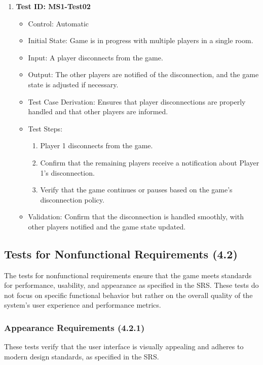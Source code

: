 \documentclass[12pt, titlepage]{article}
\begin{document}
\begin{enumerate}
    \item \textbf{Test ID: MS1-Test02}
        \begin{itemize}
            \item Control: Automatic
            \item Initial State: Game is in progress with multiple players in a single room.
            \item Input: A player disconnects from the game.
            \item Output: The other players are notified of the disconnection, and the game state is adjusted if necessary.
            \item Test Case Derivation: Ensures that player disconnections are properly handled and that other players are informed.
            \item Test Steps:
                \begin{enumerate}
                    \item Player 1 disconnects from the game.
                    \item Confirm that the remaining players receive a notification about Player 1’s disconnection.
                    \item Verify that the game continues or pauses based on the game’s disconnection policy.
                \end{enumerate}
            \item Validation: Confirm that the disconnection is handled smoothly, with other players notified and the game state updated.
        \end{itemize}
\end{enumerate}

\subsection{Tests for Nonfunctional Requirements (4.2)}

The tests for nonfunctional requirements ensure that the game meets standards for performance, usability, and appearance as specified in the SRS. These tests do not focus on specific functional behavior but rather on the overall quality of the system’s user experience and performance metrics.

\subsubsection{Appearance Requirements (4.2.1)}

These tests verify that the user interface is visually appealing and adheres to modern design standards, as specified in the SRS.
\end{document}
